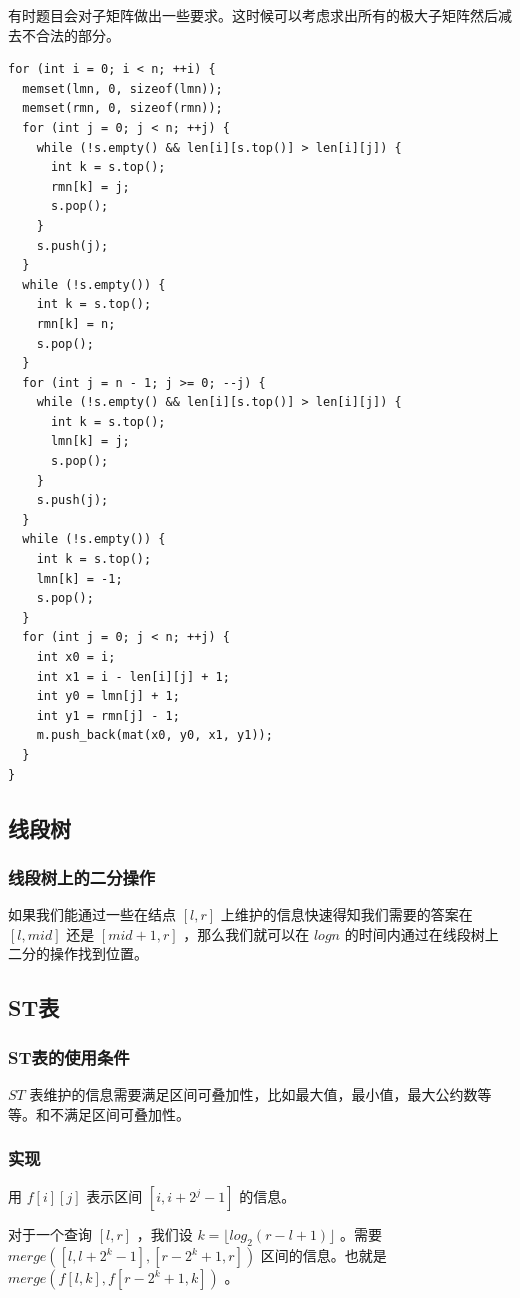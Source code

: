 \documentclass[11pt]{article}
\begin{document}
有时题目会对子矩阵做出一些要求。这时候可以考虑求出所有的极大子矩阵然后减去不合法的部分。

\begin{verbatim}
for (int i = 0; i < n; ++i) {
  memset(lmn, 0, sizeof(lmn));
  memset(rmn, 0, sizeof(rmn));
  for (int j = 0; j < n; ++j) {
    while (!s.empty() && len[i][s.top()] > len[i][j]) {
      int k = s.top();
      rmn[k] = j;
      s.pop();
    }
    s.push(j);
  }
  while (!s.empty()) {
    int k = s.top();
    rmn[k] = n;
    s.pop();
  }
  for (int j = n - 1; j >= 0; --j) {
    while (!s.empty() && len[i][s.top()] > len[i][j]) {
      int k = s.top();
      lmn[k] = j;
      s.pop();
    }
    s.push(j);
  }
  while (!s.empty()) {
    int k = s.top();
    lmn[k] = -1;
    s.pop();
  }
  for (int j = 0; j < n; ++j) {
    int x0 = i;
    int x1 = i - len[i][j] + 1;
    int y0 = lmn[j] + 1;
    int y1 = rmn[j] - 1;
    m.push_back(mat(x0, y0, x1, y1));
  }
}
\end{verbatim}
\subsection{线段树}
\label{sec-4-2}
\subsubsection{线段树上的二分操作}
\label{sec-4-2-1}

如果我们能通过一些在结点 $[l,r]$ 上维护的信息快速得知我们需要的答案在 $[l,mid]$ 还是 $[mid+1,r]$ ，那么我们就可以在 $logn$ 的时间内通过在线段树上二分的操作找到位置。
\subsection{ST表}
\label{sec-4-3}

\subsubsection{ST表的使用条件}
\label{sec-4-3-1}

$ST$ 表维护的信息需要满足区间可叠加性，比如最大值，最小值，最大公约数等等。和不满足区间可叠加性。

\subsubsection{实现}
\label{sec-4-3-2}

用 $f[i][j]$ 表示区间 $[i,i+2^j-1]$ 的信息。

对于一个查询 $[l,r]$ ，我们设 $k=\lfloor log_2(r-l+1) \rfloor$ 。需要 $merge([l,l+2^k -1],[r-2^k+1,r])$ 区间的信息。也就是 $merge(f[l,k],f[r-2^k+1,k])$ 。
\end{document}
